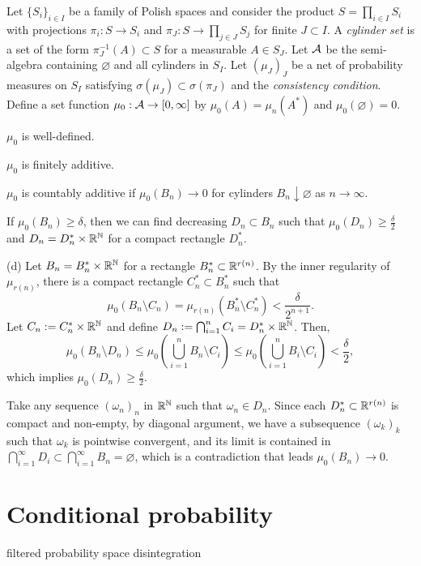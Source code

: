 \documentclass{../../large}
\begin{document}
\begin{prb}
Let $\{S_i\}_{i\in I}$ be a family of Polish spaces and 
consider the product $S=\prod_{i\in I}S_i$ with projections $\pi_i:S\to S_i$ and $\pi_J:S\to\prod_{j\in J}S_j$ for finite $J\subset I$.
A \emph{cylinder set} is a set of the form $\pi_J^{-1}(A)\subset S$ for a measurable $A\in S_J$.
Let $\mathcal{A}$ be the semi-algebra containing $\varnothing$ and all cylinders in $S_I$.
Let $(\mu_J)_J$ be a net of probability measures on $S_I$ satisfying $\sigma(\mu_J)\subset\sigma(\pi_J)$ and the \emph{consistency condition}.
Define a set function $\mu_0:\mathcal{A}\to[0,\infty]$ by $\mu_0(A)=\mu_n(A^*)$ and $\mu_0(\varnothing)=0$.
\begin{parts}
\item $\mu_0$ is well-defined.
\item $\mu_0$ is finitely additive.
\item $\mu_0$ is countably additive if $\mu_0(B_n)\to0$ for cylinders $B_n\downarrow\varnothing$ as $n\to\infty$.
\item If $\mu_0(B_n)\ge\delta$, then we can find decreasing $D_n\subset B_n$ such that $\mu_0(D_n)\ge\frac\delta2$ and $D_n=D_n^*\times\mathbb{R}^{\mathbb{N}}$ for a compact rectangle $D_n^*$.

\end{parts}
\end{prb}
\begin{pf}


(d)
Let $B_n=B_n^*\times\mathbb{R}^{\mathbb{N}}$ for a rectangle $B_n^*\subset\mathbb{R}^{r(n)}$.
By the inner regularity of $\mu_{r(n)}$, there is a compact rectangle $C_n^*\subset B_n^*$ such that
\[\mu_0(B_n\setminus C_n)=\mu_{r(n)}(B_n^*\setminus C_n^*)<\frac\delta{2^{n+1}}.\]
Let $C_n:=C_n^*\times\mathbb{R}^{\mathbb{N}}$ and define $D_n:=\bigcap_{i=1}^nC_i=D_n^*\times\mathbb{R}^{\mathbb{N}}$.
Then,
\[\mu_0(B_n\setminus D_n)\le\mu_0(\bigcup_{i=1}^nB_n\setminus C_i)\le\mu_0(\bigcup_{i=1}^nB_i\setminus C_i)<\frac\delta2,\]
which implies $\mu_0(D_n)\ge\frac\delta2$.

Take any sequence $(\omega_n)_n$ in $\mathbb{R}^{\mathbb{N}}$ such that $\omega_n\in D_n$.
Since each $D_n^*\subset\mathbb{R}^{r(n)}$ is compact and non-empty, by diagonal argument, we have a subsequence $(\omega_k)_k$ such that $\omega_k$ is pointwise convergent, and its limit is contained in $\bigcap_{i=1}^\infty D_i\subset\bigcap_{i=1}^\infty B_n=\varnothing$, which is a contradiction that leads $\mu_0(B_n)\to0$.
\end{pf}


\section{Conditional probability}
filtered probability space
disintegration
\end{document}
